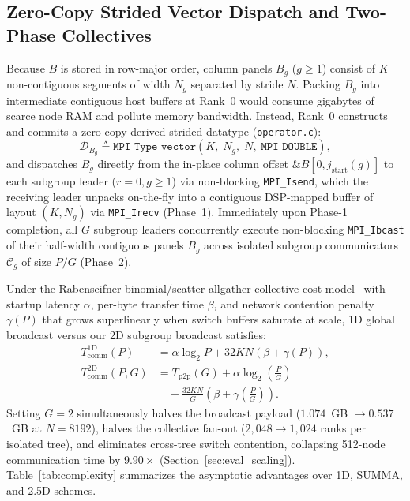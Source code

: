 \documentclass[journal]{IEEEtran}
\begin{document}
\subsection{Zero-Copy Strided Vector Dispatch and Two-Phase Collectives}
Because $B$ is stored in row-major order, column panels $B_g$ ($g \ge 1$) consist of $K$ non-contiguous segments of width $N_g$ separated by stride $N$. Packing $B_g$ into intermediate contiguous host buffers at Rank~0 would consume gigabytes of scarce node RAM and pollute memory bandwidth. Instead, Rank~0 constructs and commits a zero-copy derived strided datatype (\texttt{operator.c}):
\begin{equation}
\mathcal{D}_{B_g} \triangleq \texttt{MPI\_Type\_vector}(K,\; N_g,\; N,\; \texttt{MPI\_DOUBLE}),
\label{eq:mpi_vector}
\end{equation}
and dispatches $B_g$ directly from the in-place column offset $\&B[0, j_{\mathrm{start}}(g)]$ to each subgroup leader ($r=0, g \ge 1$) via non-blocking \texttt{MPI\_Isend}, which the receiving leader unpacks on-the-fly into a contiguous DSP-mapped buffer of layout $(K, N_g)$ via \texttt{MPI\_Irecv} (Phase~1). Immediately upon Phase-1 completion, all $G$ subgroup leaders concurrently execute non-blocking \texttt{MPI\_Ibcast} of their half-width contiguous panels $B_g$ across isolated subgroup communicators $\mathcal{C}_g$ of size $P/G$ (Phase~2).

Under the Rabenseifner binomial/scatter-allgather collective cost model~\cite{thakur2005mpich} with startup latency $\alpha$, per-byte transfer time $\beta$, and network contention penalty $\gamma(P)$ that grows superlinearly when switch buffers saturate at scale, 1D global broadcast versus our 2D subgroup broadcast satisfies:
\begin{equation}
\begin{aligned}
T_{\mathrm{comm}}^{\mathrm{1D}}(P) &= \alpha \log_2 P + 32 K N \left(\beta + \gamma(P)\right), \\
T_{\mathrm{comm}}^{\mathrm{2D}}(P, G) &= T_{\mathrm{p2p}}(G) + \alpha \log_2\!\left(\frac{P}{G}\right) \\
&\quad + \frac{32 K N}{G}\!\left(\beta + \gamma\!\left(\frac{P}{G}\right)\right).
\end{aligned}
\label{eq:comm_cost}
\end{equation}
Setting $G=2$ simultaneously halves the broadcast payload ($1.074$~GB $\to 0.537$~GB at $N=8192$), halves the collective fan-out ($2{,}048 \to 1{,}024$ ranks per isolated tree), and eliminates cross-tree switch contention, collapsing 512-node communication time by $9.90\times$ (Section~\ref{sec:eval_scaling}). Table~\ref{tab:complexity} summarizes the asymptotic advantages over 1D, SUMMA, and 2.5D schemes.
\end{document}
